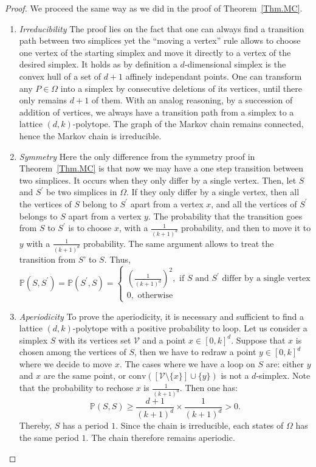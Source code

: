 \documentclass[a4paper]{article}
\begin{document}
\begin{proof}
  We proceed the same way as we did in the proof of Theorem~\ref{Thm.MC}.

  \begin{enumerate}[i]
    \item \textit{Irreducibility}
    The proof lies on the fact that one can always find a transition path between two simplices yet the “moving a vertex” rule allows to choose one vertex of the starting simplex and move it directly to a vertex of the desired simplex. It holds as by definition a $d$-dimensional simplex is the convex hull of a set of $d+1$ affinely independant points. One can transform any $P\in\Omega$ into a simplex by consecutive deletions of its vertices, until there only remains $d+1$ of them. With an analog reasoning, by a succession of addition of vertices, we always have a transition path from a simplex to a lattice $(d,k)$-polytope. The graph of the Markov chain remains connected, hence the Markov chain is irreducible.

    \item \textit{Symmetry}
    Here the only difference from the symmetry proof in Theorem~\ref{Thm.MC} is that now we may have a one step transition between two simplices. It occurs when they only differ by a single vertex. Then, let $S$ and $S^\prime$ be two simplices in $\Omega$. If they only differ by a single vertex, then all the vertices of $S$ belong to $S^\prime$ apart from a vertex $x$, and all the vertices of $S^\prime$ belongs to $S$ apart from a vertex $y$. The probability that the transition goes from $S$ to $S^\prime$ is to choose $x$, with a $\frac{1}{(k+1)^d}$ probability, and then to move it to $y$ with a $\frac{1}{(k+1)^d}$ probability. The same argument allows to treat the transition from $S’$ to $S$. Thus,
    $$
      \mathbb{P}(S,S^\prime)=\mathbb{P}(S^\prime,S)=
      \begin{cases}
        \left(\frac{1}{(k+1)^d}\right)^2 , \text{ if } S \text{ and } S^\prime \text{ differ by a single vertex}\\
        0, \text{ otherwise}
      \end{cases}
    $$

    \item \textit{Aperiodicity}
    To prove the aperiodicity, it is necessary and sufficient to find a lattice $(d,k)$-polytope with a positive probability to loop. Let us consider a simplex $S$ with its vertices set $\mathcal{V}$ and a point $x \in [0,k]^d$. Suppose that $x$ is chosen among the vertices of $S$, then we have to redraw a point $y\in [0,k]^d$ where we decide to move $x$. The cases where we have a loop on $S$ are: either $y$ and $x$ are the same point, or $\mathrm{conv}([\mathcal{V}\mathord{\setminus}\{x\}]\cup\{y\})$ is not a $d$-simplex. Note that the probability to rechose $x$ is $\frac{1}{(k+1)^d}$.
    Then one has:
    $$
      \mathbb{P}(S,S)\geq{\frac{d+1}{(k+1)^d}\times\frac{1}{(k+1)^d}}>0.
    $$
    Thereby, $S$ has a period $1$. Since the chain is irreducible, each states of $\Omega$ has the same period $1$. The chain therefore remains aperiodic.
  \end{enumerate}
\end{proof}
\end{document}
